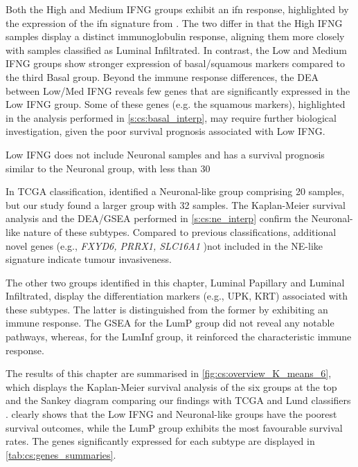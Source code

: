 Both the High and Medium IFNG groups exhibit an \acrshort{ifn} response, highlighted by the expression of the \acrshort{ifn} signature from \citet{Baker2022-bj}. The two differ in that the High IFNG samples display a distinct immunoglobulin response, aligning them more closely with samples classified as Luminal Infiltrated. In contrast, the Low and Medium IFNG groups show stronger expression of basal/squamous markers compared to the third Basal group. Beyond the immune response differences, the DEA between Low/Med IFNG reveals few genes that are significantly expressed in the Low IFNG group. Some of these genes (e.g. the squamous markers), highlighted in the analysis performed in \cref{s:cs:basal_interp}, may require further biological investigation, given the poor survival prognosis associated with Low IFNG.

Low IFNG does not include Neuronal samples and has a survival prognosis similar to the Neuronal group, with less than 30%

In TCGA classification, \citet{Robertson2017-mg} identified a Neuronal-like group comprising 20 samples, but our study found a larger group with 32 samples. The Kaplan-Meier survival analysis and the DEA/GSEA performed in \cref{s:cs:ne_interp} confirm the Neuronal-like nature of these subtypes. Compared to previous classifications, additional novel genes (e.g., \textit{FXYD6, PRRX1, SLC16A1} )not included in the NE-like signature indicate tumour invasiveness.

The other two groups identified in this chapter, Luminal Papillary and Luminal Infiltrated, display the differentiation markers (e.g., UPK, KRT) associated with these subtypes. The latter is distinguished from the former by exhibiting an immune response. The GSEA for the LumP group did not reveal any notable pathways, whereas, for the LumInf group, it reinforced the characteristic immune response.


The results of this chapter are summarised in \cref{fig:cs:overview_K_means_6}, which displays the Kaplan-Meier survival analysis of the six groups at the top and the Sankey diagram comparing our findings with TCGA and Lund classifiers \citep{Robertson2017-mg,Marzouka2018-ge}.  clearly shows that the Low IFNG and Neuronal-like groups have the poorest survival outcomes, while the LumP group exhibits the most favourable survival rates. The genes significantly expressed for each subtype are displayed in \cref{tab:cs:genes_summaries}.
 
